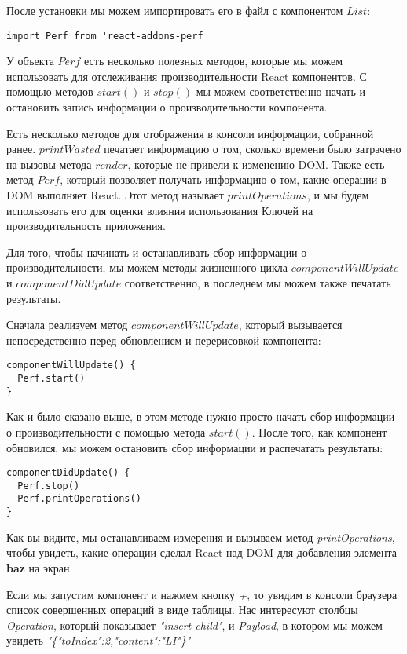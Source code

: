 После установки мы можем импортировать его в файл с компонентом $List$:

\begin{lstlisting}
import Perf from 'react-addons-perf
\end{lstlisting}

У объекта $Perf$ есть несколько полезных методов, которые мы можем использовать для отслеживания производительности React компонентов. С помощью методов $start()$ и $stop()$ мы можем соответственно начать и остановить запись информации о производительности компонента. 

Есть несколько методов для отображения в консоли информации, собранной ранее. $printWasted$ печатает информацию о том, сколько времени было затрачено на вызовы метода $render$, которые не привели к изменению DOM. Также есть метод $Perf$, который позволяет получать информацию о том, какие операции в DOM выполняет React. Этот метод называет $printOperations$, и мы будем использовать его для оценки влияния использования Ключей на производительность приложения. 

Для того, чтобы начинать и останавливать сбор информации о производительности, мы можем методы жизненного цикла $componentWillUpdate$ и $componentDidUpdate$ соответственно, в последнем мы можем также печатать результаты.

Сначала реализуем метод $componentWillUpdate$, который вызывается непосредственно перед обновлением и перерисовкой компонента:

\begin{lstlisting}
componentWillUpdate() {
  Perf.start()
}
\end{lstlisting}

Как и было сказано выше, в этом методе нужно просто начать сбор информации о производительности с помощью метода $start()$. После того, как компонент обновился, мы можем остановить сбор информации и распечатать результаты:

\begin{lstlisting}
componentDidUpdate() {
  Perf.stop()
  Perf.printOperations()
}
\end{lstlisting}

Как вы видите, мы останавливаем измерения и вызываем метод \textit{printOperations}, чтобы увидеть, какие операции сделал React над DOM для добавления элемента \textbf{baz} на экран.

Если мы запустим компонент и нажмем кнопку \textit{+}, то увидим в консоли браузера список совершенных операций в виде таблицы. Нас интересуют столбцы \textit{Operation}, который показывает \textit{"insert child"}, и \textit{Payload}, в котором мы можем увидеть \textit{"\{"toIndex":2,"content":"LI"\}"} 

